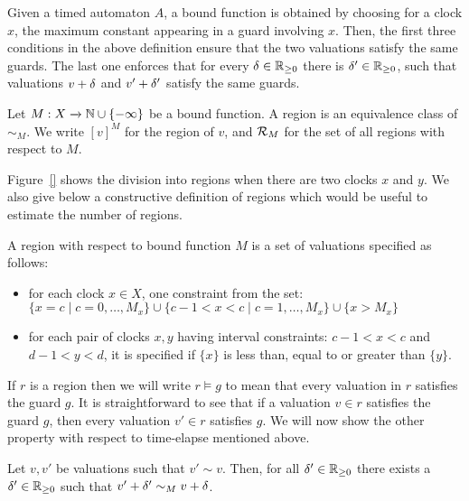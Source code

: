 Given a timed automaton $A$, a bound function is obtained by choosing for a clock $x$, the maximum constant appearing in a guard involving $x$. Then, the first three conditions in the above definition ensure that the two valuations satisfy the same guards. The last one enforces that for every $\delta \in \mathbb{R}_{\ge 0}$ there is $\delta' \in \mathbb{R}_{\ge 0}$, such that valuations $v + \delta$ and $v' + \delta'$ satisfy the same guards.

\begin{definition}
Let $M : X \xrightarrow{} \mathbb{N} \cup \{-\infty\}$ be a bound function. A region is an equivalence class of $\sim_M$. We write $[v]^M$ for the region of $v$, and ${\mathcal R}_M$ for the set of all regions with respect to $M$.
\end{definition}

Figure~\ref{} shows the division into regions when there are two clocks $x$ and $y$. We also give below a constructive definition of regions which would be useful to estimate the number of regions.

\begin{definition}
A region with respect to bound function $M$ is a set of valuations specified as follows:
\begin{itemize}
	\item for each clock $x \in X$, one constraint from the set: $\{x = c \mid c = 0, \dots, M_x\} \cup \{c - 1 < x < c \mid c = 1, \dots, M_x\} \cup \{x > M_x\}$
	\item for each pair of clocks $x, y$ having interval constraints: $c - 1 < x < c$ and $d - 1 < y < d$, it is specified if $\{x\}$ is less than, equal to or greater than $\{y\}$.
\end{itemize}
\end{definition}

If $r$ is a region then we will write $r \models g$ to mean that every valuation in $r$ satisfies the guard $g$. It is straightforward to see that if a valuation $v \in r$ satisfies the guard $g$, then every valuation $v' \in r$ satisfies $g$. We will now show the other property with respect to time-elapse mentioned above.

\begin{lemma}
Let $v, v'$ be valuations such that $v' \sim v$. Then, for all $\delta' \in \mathbb{R}_{\ge 0}$ there exists a $\delta' \in \mathbb{R}_{\ge 0}$ such that $v' + \delta' \sim_M v + \delta$.
\end{lemma}

